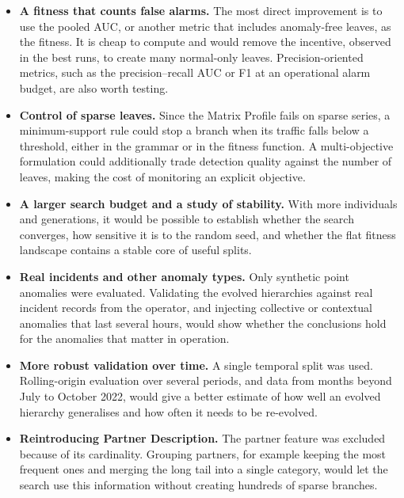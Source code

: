 \begin{itemize}
    \item \textbf{A fitness that counts false alarms.}
    The most direct improvement is to use the pooled \ac{AUC}, or another metric that includes anomaly-free leaves, as the fitness.
    It is cheap to compute and would remove the incentive, observed in the best runs, to create many normal-only leaves.
    Precision-oriented metrics, such as the precision–recall \ac{AUC} or F1 at an operational alarm budget, are also worth testing.

    \item \textbf{Control of sparse leaves.}
    Since the Matrix Profile fails on sparse series, a minimum-support rule could stop a branch when its traffic falls below a threshold, either in the grammar or in the fitness function.
    A multi-objective formulation could additionally trade detection quality against the number of leaves, making the cost of monitoring an explicit objective.

    \item \textbf{A larger search budget and a study of stability.}
    With more individuals and generations, it would be possible to establish whether the search converges, how sensitive it is to the random seed, and whether the flat fitness landscape contains a stable core of useful splits.

    \item \textbf{Real incidents and other anomaly types.}
    Only synthetic point anomalies were evaluated.
    Validating the evolved hierarchies against real incident records from the operator, and injecting collective or contextual anomalies that last several hours, would show whether the conclusions hold for the anomalies that matter in operation.

    \item \textbf{More robust validation over time.}
    A single temporal split was used.
    Rolling-origin evaluation over several periods, and data from months beyond July to October 2022, would give a better estimate of how well an evolved hierarchy generalises and how often it needs to be re-evolved.

    \item \textbf{Reintroducing Partner Description.}
    The partner feature was excluded because of its cardinality.
    Grouping partners, for example keeping the most frequent ones and merging the long tail into a single category, would let the search use this information without creating hundreds of sparse branches.


\end{itemize}
